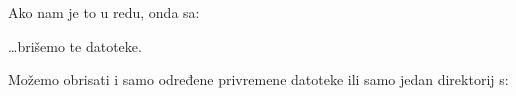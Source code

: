 Ako nam je to u redu, onda sa:


\dots{}brišemo te datoteke.

Možemo obrisati i samo određene privremene datoteke ili samo jedan direktorij s:




